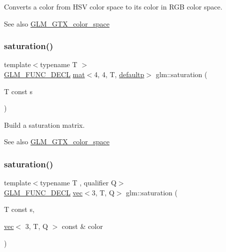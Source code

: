 Converts a color from H\+SV color space to its color in R\+GB color space. \begin{DoxySeeAlso}{See also}
\hyperlink{group__gtx__color__space}{G\+L\+M\+\_\+\+G\+T\+X\+\_\+color\+\_\+space} 
\end{DoxySeeAlso}
\mbox{\label{group__gtx__color__space_ga01a97152b44e1550edcac60bd849e884}} 
\subsubsection{\texorpdfstring{saturation()}{saturation()}\hspace{0.1cm}{\footnotesize\ttfamily [1/3]}}
{\footnotesize\ttfamily template$<$typename T $>$ \\
\hyperlink{setup_8hpp_ab2d052de21a70539923e9bcbf6e83a51}{G\+L\+M\+\_\+\+F\+U\+N\+C\+\_\+\+D\+E\+CL} \hyperlink{structglm_1_1mat}{mat}$<$4, 4, T, \hyperlink{namespaceglm_a36ed105b07c7746804d7fdc7cc90ff25a9d21ccd8b5a009ec7eb7677befc3bf51}{defaultp}$>$ glm\+::saturation (\begin{DoxyParamCaption}\item[{T const}]{s }\end{DoxyParamCaption})}

Build a saturation matrix. \begin{DoxySeeAlso}{See also}
\hyperlink{group__gtx__color__space}{G\+L\+M\+\_\+\+G\+T\+X\+\_\+color\+\_\+space} 
\end{DoxySeeAlso}
\mbox{\label{group__gtx__color__space_ga2156cea600e90148ece5bc96fd6db43a}} 
\subsubsection{\texorpdfstring{saturation()}{saturation()}\hspace{0.1cm}{\footnotesize\ttfamily [2/3]}}
{\footnotesize\ttfamily template$<$typename T , qualifier Q$>$ \\
\hyperlink{setup_8hpp_ab2d052de21a70539923e9bcbf6e83a51}{G\+L\+M\+\_\+\+F\+U\+N\+C\+\_\+\+D\+E\+CL} \hyperlink{structglm_1_1vec}{vec}$<$3, T, Q$>$ glm\+::saturation (\begin{DoxyParamCaption}\item[{T const}]{s,  }\item[{\hyperlink{structglm_1_1vec}{vec}$<$ 3, T, Q $>$ const \&}]{color }\end{DoxyParamCaption})}


